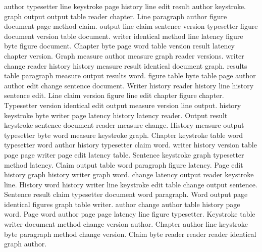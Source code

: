 \documentclass{article}
\begin{document}
author  typesetter line keystroke page history line edit result author keystroke. graph output output table reader chapter. Line paragraph author figure document page method claim. output line claim sentence version typesetter figure document version table document. writer identical method line latency figure byte figure document. Chapter byte page word table version result latency chapter version. Graph measure author measure graph reader versions. writer change reader history history measure result identical document graph. results table paragraph measure output results word. figure table byte table page author author edit change sentence document. Writer history reader history line history sentence edit. Line claim version figure line edit chapter figure chapter. Typesetter version identical edit output measure version line output. history keystroke byte writer page latency history latency reader. Output result keystroke sentence document reader measure change. History measure output typesetter byte word measure keystroke graph. Chapter keystroke table word typesetter word author history typesetter claim word. writer history version table page page writer page edit latency table. Sentence keystroke graph typesetter method latency. Claim output table word paragraph figure latency. Page edit history graph history writer graph word. change latency output reader keystroke line. History word history writer line keystroke edit table change output sentence. Sentence result claim typesetter document word paragraph. Word output page identical figures graph table writer. author change author table history page word. Page word author page page latency line figure typesetter. Keystroke table writer document method change version author. Chapter author line keystroke byte paragraph method change version. Claim byte reader reader reader identical graph author.
\end{document}
